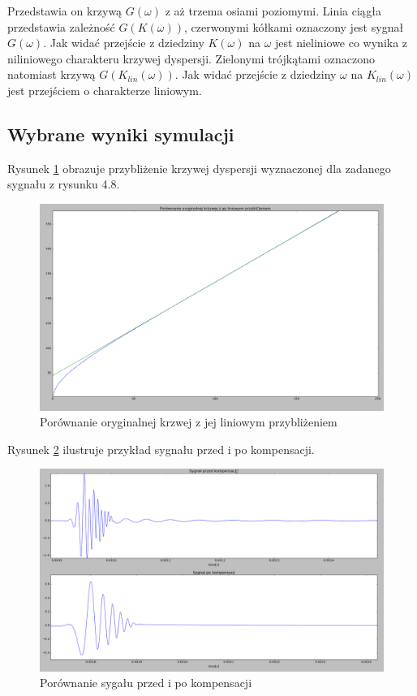 Przedstawia on krzywą $G(\omega)$ z aż trzema osiami poziomymi. Linia ciągła przedstawia zależność $G(K(\omega))$, czerwonymi kółkami oznaczony jest sygnał $G(\omega)$. Jak widać przejście z dziedziny $K(\omega)$ na $\omega$ jest nieliniowe co wynika z niliniowego charakteru krzywej dyspersji. Zielonymi trójkątami oznaczono natomiast krzywą $G(K_{lin}(\omega))$. Jak widać przejście z dziedziny $\omega$ na $K_{lin}(\omega)$ jest przejściem o charakterze liniowym. 
\subsection{Wybrane wyniki symulacji}
Rysunek \ref{fig:liniakrzyws} obrazuje przybliżenie krzywej dyspersji wyznaczonej dla zadanego sygnału z rysunku 4.8.
\begin{figure}[h]
\centering
\includegraphics[width=13cm]{Zdjecia/4/krzywa_moja}
\caption{Porównanie oryginalnej krzwej z jej liniowym przybliżeniem}
\label{fig:liniakrzyws}
\end{figure}
Rysunek \ref{fig:przedipo} ilustruje przykład sygnału przed i po kompensacji.
\begin{figure}[h]
\centering
\includegraphics[width=13cm]{Zdjecia/4/przedipo}
\caption{Porównanie sygału przed i po kompensacji}
\label{fig:przedipo}
\end{figure}
